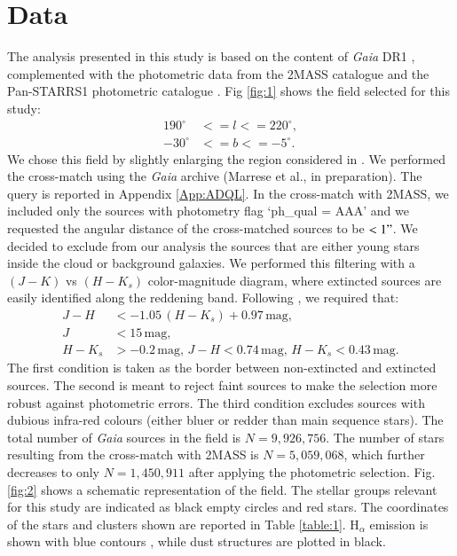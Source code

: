 \documentclass[twocolumn]{aa}
\begin{document}
\section{Data}
The analysis presented in this study is based on the content of \textit{Gaia} DR1 \citep{Brown2016, vanLeeuwen2017}, complemented with the photometric data from the 2MASS catalogue \citep{Skrutskie2006} and the Pan-STARRS1 photometric catalogue \citep{Chambers2016}. 
Fig \ref{fig:1} shows the field selected for this study:
\begin{align}\label{eq:1}
190^{\circ} & <=  l <= 220^{\circ}, \nonumber \\ 
-30^{\circ}  & <= b <= -5^{\circ}.
\end{align}
We chose this field by slightly enlarging the region considered in \cite{deZeeuw1999}. 
We performed the cross-match using the \textit{Gaia} archive  (Marrese et al., in preparation). The query is reported in Appendix \ref{App:ADQL}.
In the cross-match with 2MASS, we included only the sources with photometry flag  `ph\_qual = AAA'  and we requested the angular distance of the cross-matched sources to be $< 1"$. We decided to exclude from our analysis the sources that are either young stars inside the cloud or background galaxies. We performed this filtering with a $(J-K)$ vs $(H-K_s)$ color-magnitude diagram, where extincted sources are easily identified along the reddening band. Following \cite{Alves2012},  we required that: 
\begin{align}\label{eq:cuts}
J - H & < - 1.05\,(H - K_s) + 0.97  \, \mathrm{mag}, \nonumber \\
J & < 15 \, \mathrm{mag}, \nonumber \\
H - K_s & > -0.2  \, \mathrm{mag},\, 
J - H < 0.74 \, \mathrm{mag},\,
H - K_s < 0.43 \, \mathrm{mag}.   
\end{align}
The first condition is taken as the border between non-extincted and extincted sources.
The second is meant to reject faint sources to make the selection more robust against photometric errors. The third condition excludes sources with dubious infra-red colours (either bluer or redder than main sequence stars).
The total number of \textit{Gaia} sources in the field is $N = 9,926,756$.
The number of stars resulting from the cross-match with 2MASS is $N = 5,059,068$, which further decreases to only $N = 1,450,911
$ after applying the photometric selection.
Fig. \ref{fig:2} shows a schematic representation of the field. The stellar groups relevant for this study are indicated as black empty circles and red stars. The coordinates of the stars and clusters shown are reported in Table \ref{table:1}. H$_{\alpha}$ emission \citep{Finkbeiner2003} is shown with blue contours , while dust structures \citep{Planck2014} are plotted in black. 
\end{document}
